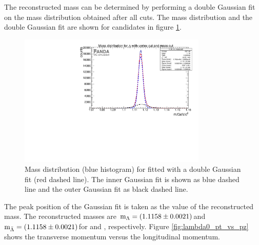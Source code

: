 		The reconstructed mass can be determined by performing a double Gaussian fit on the mass distribution obtained after all cuts.
		The mass distribution and the double Gaussian fit are shown for \lam candidates in figure \ref{fig:lambda0_massfit}.
		
		\begin{figure}
			\centering
				\includegraphics[width=0.8\textwidth]{./plots/lambda0/lambda0_m_masscut2.pdf}
			\caption{\propose Mass distribution (blue histogram) for \lam fitted with a double Gaussian fit (red dashed line). 
			The inner Gaussian fit is shown as blue dashed line and the outer Gaussian fit as black dashed line.}
		
			\label{fig:lambda0_massfit}
		\end{figure}
		
		The peak position of the Gaussian fit is taken as the value of the reconstructed mass.
		The reconstructed masses are $\textnormal{m}_{\Lambda} = \left(1.1158 \pm 0.0021\right)$\massunit and 
		$\textnormal{m}_{\bar{\Lambda}} = \left(1.1158 \pm 0.0021\right)$\massunit for \lam and \alam, respectively. 
		Figure \ref{fig:lambda0_pt_vs_pz} shows the transverse momentum versus the longitudinal momentum.
				
